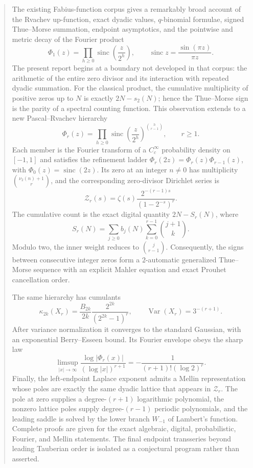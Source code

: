 \documentclass[11pt,a4paper]{article}
\theoremstyle{frontier}
\theoremstyle{definition}
\newcommand{\sinc}{\operatorname{sinc}}
\newcommand{\Var}{\operatorname{Var}}
\begin{document}
\begin{abstract}
The existing Fabius-function corpus gives a remarkably broad account of the Rvachev up-function, exact dyadic values, $q$-binomial formulae, signed Thue--Morse summation, endpoint asymptotics, and the pointwise and metric decay of the Fourier product \cite{aistleitner-hofer-larcher}
\[
  \Phi_1(z)=\prod_{h\ge 0}\sinc\!\left(\frac{z}{2^h}\right),
  \qquad \sinc z=\frac{\sin(\pi z)}{\pi z}.
\]
The present report begins at a boundary not developed in that corpus: the arithmetic of the entire zero divisor and its interaction with repeated dyadic summation.  For the classical product, the cumulative multiplicity of positive zeros up to $N$ is exactly $2N-s_2(N)$; hence the Thue--Morse sign is the parity of a spectral counting function.  This observation extends to a new Pascal--Rvachev hierarchy
\[
  \Phi_r(z)=\prod_{h\ge0}\sinc\!\left(\frac z{2^h}\right)^{\binom h{r-1}},
  \qquad r\ge1.
\]
Each member is the Fourier transform of a $C_c^\infty$ probability density on $[-1,1]$ and satisfies the refinement ladder $\Phi_r(2z)=\Phi_r(z)\Phi_{r-1}(z)$, with $\Phi_0(z)=\sinc(2z)$.  Its zero at an integer $n\ne0$ has multiplicity $\binom{\nu_2(n)+1}{r}$, and the corresponding zero-divisor Dirichlet series is
\[
  \mathcal Z_r(s)=\zeta(s)\frac{2^{-(r-1)s}}{(1-2^{-s})^r}.
\]
The cumulative count is the exact digital quantity $2N-S_r(N)$, where
\[
 S_r(N)=\sum_{j\ge0}b_j(N)\sum_{k=0}^{r-1}\binom{j+1}{k}.
\]
Modulo two, the inner weight reduces to $\binom j{r-1}$.  Consequently, the signs between consecutive integer zeros form a $2$-automatic generalized Thue--Morse sequence with an explicit Mahler equation and exact Prouhet cancellation order.

The same hierarchy has cumulants
\[
 \kappa_{2k}(X_r)=\frac{B_{2k}}{2k}\frac{2^{2k}}{(2^{2k}-1)^r},
 \qquad \Var(X_r)=3^{-(r+1)}.
\]
After variance normalization it converges to the standard Gaussian, with an exponential Berry--Esseen bound.  Its Fourier envelope obeys the sharp law
\[
 \limsup_{|x|\to\infty}\frac{\log|\Phi_r(x)|}{(\log|x|)^{r+1}}
 =-\frac{1}{(r+1)!(\log2)^r}.
\]
Finally, the left-endpoint Laplace exponent admits a Mellin representation whose poles are exactly the same dyadic lattice that appears in $\mathcal Z_r$.  The pole at zero supplies a degree-$(r+1)$ logarithmic polynomial, the nonzero lattice poles supply degree-$(r-1)$ periodic polynomials, and the leading saddle is solved by the lower branch $W_{-1}$ of Lambert's function.  Complete proofs are given for the exact algebraic, digital, probabilistic, Fourier, and Mellin statements.  The final endpoint transseries beyond leading Tauberian order is isolated as a conjectural program rather than asserted.
\end{abstract}
\end{document}
